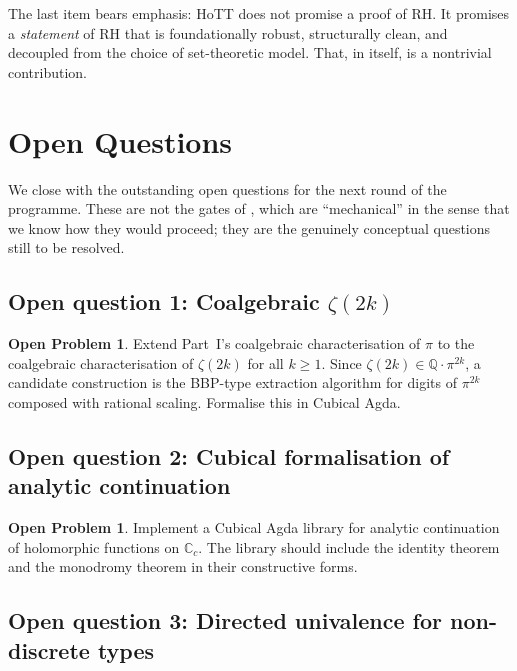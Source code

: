 \documentclass[12pt]{article}
\theoremstyle{definition}
\newtheorem{problem}[theorem]{Open Problem}
\theoremstyle{remark}
\newcommand{\C}{\mathbb{C}}
\newcommand{\Cc}{\C_{c}}
\begin{document}
The last item bears emphasis: HoTT does not promise a proof of RH\@. It
promises a \emph{statement} of RH that is foundationally robust,
structurally clean, and decoupled from the choice of set-theoretic
model. That, in itself, is a nontrivial contribution.

\section{Open Questions}\label{sec:open}

We close with the outstanding open questions for the next round of the
programme. These are not the gates of , which are
``mechanical'' in the sense that we know how they would proceed; they
are the genuinely conceptual questions still to be resolved.

\subsection{Open question 1: Coalgebraic \texorpdfstring{$\zeta(2k)$}{zeta(2k)}}

\begin{problem}\label{prob:openCoalg}
Extend Part~I's coalgebraic characterisation of $\pi$ to the
coalgebraic characterisation of $\zeta(2k)$ for all $k \geq 1$. Since
$\zeta(2k) \in \mathbb{Q} \cdot \pi^{2k}$, a candidate construction is
the BBP-type extraction algorithm for digits of $\pi^{2k}$ composed
with rational scaling. Formalise this in Cubical Agda.
\end{problem}

\subsection{Open question 2: Cubical formalisation of analytic
continuation}

\begin{problem}\label{prob:openCont}
Implement a Cubical Agda library for analytic continuation of holomorphic
functions on $\Cc$. The library should include the identity theorem and
the monodromy theorem in their constructive forms.
\end{problem}

\subsection{Open question 3: Directed univalence for non-discrete types}
\end{document}
